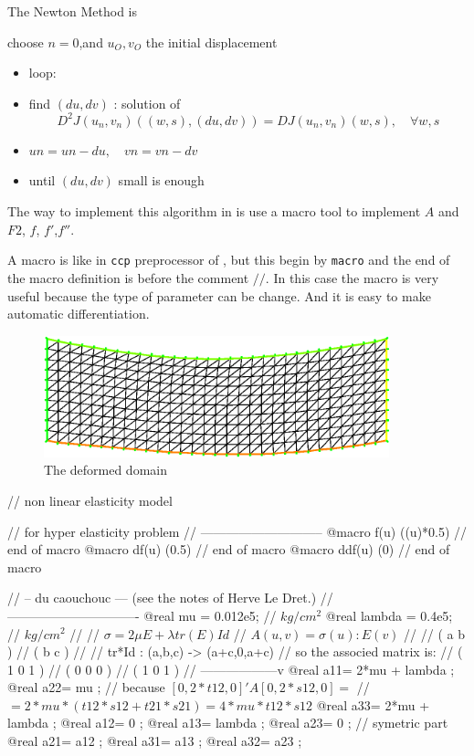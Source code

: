 \documentclass[a4paper,twoside,12pt]{book}
\begin{document}
The Newton Method is

choose $ n=0$,and $u_O,v_O$ the initial displacement
\begin{itemize}
\item loop: \\
\item  \hspace{1cm}    find $(du,dv)$ :  solution of
$$ D^2J(u_n,v_n)((w,s),(du,dv)) =  DJ(u_n,v_n)(w,s) , \quad \forall w,s $$
\item  \hspace{1cm}      $un =un - du,\quad vn =vn - dv$
\item  \hspace{1cm}      until $(du,dv)$ small is enough
\end{itemize}

\color{black}The way to implement this algorithm in \freefempp is
use a macro tool to implement  $A$ and $F2$, $f$, $f'$,$f''$.

A macro\label{macro} is like in \texttt{ccp} preprocessor of \Cpp, but this begin by
\texttt{macro} and the end of the macro definition is before  the comment $//$.
In this case the macro is very useful because the type of parameter can be change.
And it is easy to make automatic differentiation.
\begin{figure}[hbt]
\begin{center}\includegraphics[width=10cm]{nl-elas}\end{center}
\caption{\label{fig nl-elas} The deformed domain}
\end{figure}

\bFF
//  non linear elasticity model

//  for hyper elasticity problem
//  -----------------------------
@macro f(u) ((u)*0.5) // end of macro
@macro df(u) (0.5) // end of macro
@macro ddf(u) (0) // end of macro

//  -- du caouchouc --- (see the notes of Herve Le Dret.)
// -------------------------------
@real mu = 0.012e5; //  $kg/cm^2$
@real lambda =  0.4e5; //  $kg/cm^2$
//   \hfilll
//   $  \sigma = 2 \mu E + \lambda tr(E) Id $\hfilll
//   $   A(u,v)= \sigma(u):E(v) $\hfilll
//   \hfilll
//   ( a b )\hfilll
//   ( b c )\hfilll
//\hfilll
//  tr*Id : (a,b,c) -> (a+c,0,a+c) \hfilll
// so the associed matrix is:\hfilll
//   ( 1 0 1 )\hfilll
//   ( 0 0 0 )\hfilll
//   ( 1 0 1 ) \hfilll
// ------------------v
@real a11= 2*mu +  lambda  ;
@real a22= mu ; //  because $[0,2*t12,0]' A [0,2*s12,0]  =$
// $= 2*mu*(t12*s12+t21*s21) = 4*mu*t12*s12$
@real a33= 2*mu +   lambda ;
@real a12= 0 ;
@real a13= lambda ;
@real a23= 0 ;
//  symetric part
@real a21= a12 ;
@real a31= a13 ;
@real a32= a23 ;
\end{document}
